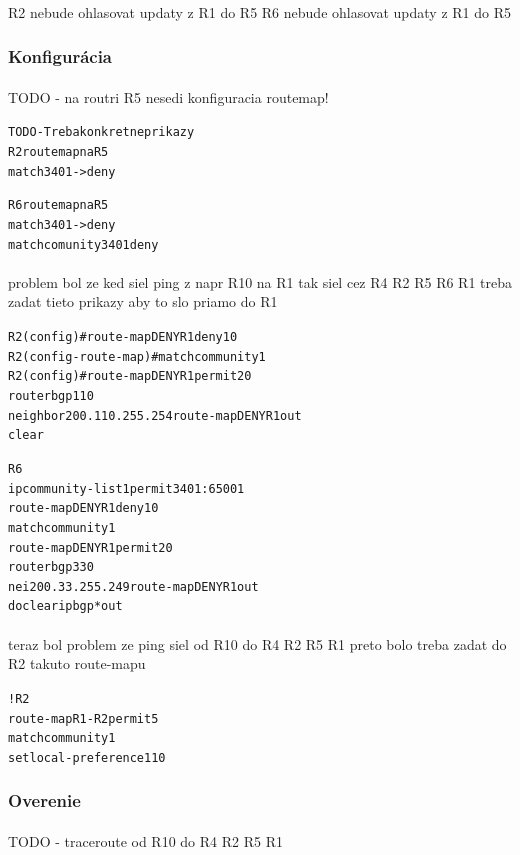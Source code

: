 \documentclass[12pt,twoside,a4paper]{report}
\begin{document}
\paragraph{}
R2 nebude ohlasovat updaty z R1 do R5
R6 nebude ohlasovat updaty z R1 do R5

\subsubsection{Konfigurácia}
\paragraph{}
TODO - na routri R5 nesedi konfiguracia routemap!

\noindent
{\selectfont
\begin{small}
\begin{alltt}
TODO - Treba konkretne prikazy
R2 route map na R5
match 3401 -> deny

R6 route map na R5
match 3401 -> deny
match comunity 3401 deny
\end{alltt}
\end{small}
}

\paragraph{}
problem bol ze ked siel ping z napr R10 na R1 tak siel cez R4 R2 R5 R6 R1
treba zadat tieto prikazy aby to slo priamo do R1

\noindent
{\selectfont
\begin{small}
\begin{alltt}
R2(config)#route-map DENYR1 deny 10
R2(config-route-map)#match community 1
R2(config)#route-map DENYR1 permit 20
router bgp 110
 neighbor 200.110.255.254 route-map DENYR1 out
clear


R6
ip community-list 1 permit 3401:65001
route-map DENYR1 deny 10
 match community 1
route-map DENYR1 permit 20
router bgp 330
 nei 200.33.255.249 route-map DENYR1 out
do clear ip bgp * out
\end{alltt}
\end{small}
}

\paragraph{}
teraz bol problem ze ping siel od R10 do R4 R2 R5 R1
preto bolo treba zadat do R2 takuto route-mapu

\noindent
{\selectfont
\begin{small}
\begin{alltt}
!R2
route-map R1-R2 permit 5
 match community 1
 set local-preference 110
\end{alltt}
\end{small}
}

\subsubsection{Overenie}
\paragraph{}
TODO - traceroute od R10 do R4 R2 R5 R1
\end{document}
